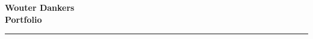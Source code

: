 \Huge\bfseries {\color{RoyalBlue} Wouter Dankers} \\
\Large\bfseries  Portfolio \\
\textcolor{RoyalBlue}{\rule{\textwidth}{\lineTickness}}
\SmallSep
